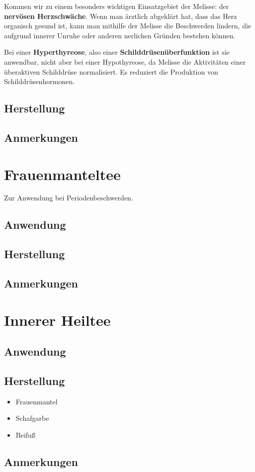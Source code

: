 Kommen wir zu einem besonders wichtigen Einsatzgebiet der Melisse: der \textbf{nervösen Herzschwäche}. Wenn man ärztlich abgeklärt hat, dass das Herz organisch gesund ist, kann man mithilfe der Melisse die Beschwerden lindern, die aufgrund innerer Unruhe oder anderen nerlichen Gründen bestehen können.

Bei einer \textbf{Hyperthyreose}, also einer \textbf{Schilddrüsenüberfunktion} ist sie anwendbar, nicht aber bei einer Hypothyreose, da Melisse die Aktivitäten einer überaktiven Schilddrüse normalisiert. Es reduziert die Produktion von Schilddrüsenhormonen.


\subsection{Herstellung}
\subsection{Anmerkungen}



\newpage



\section{Frauenmanteltee}


Zur Anwendung bei Periodenbeschwerden.

 

\subsection{Anwendung}
\subsection{Herstellung}
\subsection{Anmerkungen}



\newpage



\section{Innerer Heiltee}


\subsection{Anwendung}
\subsection{Herstellung}
\begin{itemize}
	\item Frauenmantel 
	\item Schafgarbe
	\item Beifuß
\end{itemize}

\subsection{Anmerkungen}



